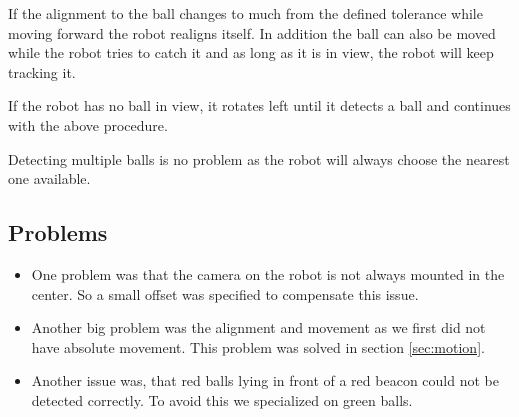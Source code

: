 \documentclass[703031]{iisreport}
\begin{document}
If the alignment to the ball changes to much from the defined tolerance while moving forward the robot realigns itself. In addition the ball can also be moved while the robot tries to catch it and as long as it is in view, the robot will keep tracking it.

If the robot has no ball in view, it rotates left until it detects a ball and continues with the above procedure.

Detecting multiple balls is no problem as the robot will always choose the nearest one available.

\subsection{Problems}
\begin{itemize}
	\item One problem was that the camera on the robot is not always mounted in the center. So a small offset was specified to compensate this issue.
	\item Another big problem was the alignment and movement as we first did not have absolute movement. This problem was solved in  section \ref{sec:motion}.
	\item Another issue was, that red balls lying in front of a red beacon could not be detected correctly. To avoid this we specialized on green balls.
\end{itemize}
\end{document}
